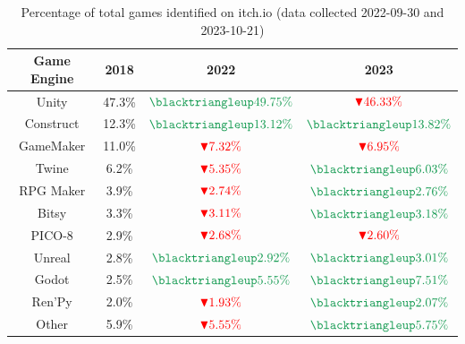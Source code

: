 \begin{table}[ht!]
    \centering
    \begin{tabular}{|c c c c|}
        \hline
        Game Engine & 2018   & 2022                                                & 2023                                                \\
        \hline\hline
        Unity       & 47.3\% & $\textcolor{ForestGreen}{\blacktriangleup 49.75\%}$ & $\textcolor{red}{\blacktriangledown 46.33\%}$       \\
        Construct   & 12.3\% & $\textcolor{ForestGreen}{\blacktriangleup 13.12\%}$ & $\textcolor{ForestGreen}{\blacktriangleup 13.82\%}$ \\
        GameMaker   & 11.0\% & $\textcolor{red}{\blacktriangledown 7.32\%}$        & $\textcolor{red}{\blacktriangledown 6.95\%}$        \\
        Twine       & 6.2\%  & $\textcolor{red}{\blacktriangledown 5.35\%}$        & $\textcolor{ForestGreen}{\blacktriangleup 6.03\%}$  \\
        RPG Maker   & 3.9\%  & $\textcolor{red}{\blacktriangledown 2.74\%}$        & $\textcolor{ForestGreen}{\blacktriangleup 2.76\%}$  \\
        Bitsy       & 3.3\%  & $\textcolor{red}{\blacktriangledown 3.11\%}$        & $\textcolor{ForestGreen}{\blacktriangleup 3.18\%}$  \\
        PICO-8      & 2.9\%  & $\textcolor{red}{\blacktriangledown 2.68\%}$        & $\textcolor{red}{\blacktriangledown 2.60\%}$        \\
        Unreal      & 2.8\%  & $\textcolor{ForestGreen}{\blacktriangleup 2.92\%}$  & $\textcolor{ForestGreen}{\blacktriangleup 3.01\%}$  \\
        Godot       & 2.5\%  & $\textcolor{ForestGreen}{\blacktriangleup 5.55\%}$  & $\textcolor{ForestGreen}{\blacktriangleup 7.51\%}$  \\
        Ren'Py      & 2.0\%  & $\textcolor{red}{\blacktriangledown 1.93\%}$        & $\textcolor{ForestGreen}{\blacktriangleup 2.07\%}$  \\
        Other       & 5.9\%  & $\textcolor{red}{\blacktriangledown 5.55\%}$        & $\textcolor{ForestGreen}{\blacktriangleup 5.75\%}$  \\
        \hline
    \end{tabular}
    \caption{Percentage of total games identified on itch.io (data collected 2022-09-30 and 2023-10-21)}
    \label{table:itch}
\end{table}

